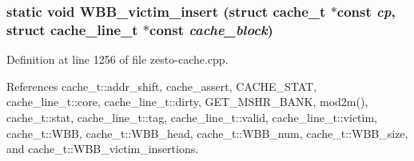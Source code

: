 \subsubsection[{WBB\_\-victim\_\-insert}]{\setlength{\rightskip}{0pt plus 5cm}static void WBB\_\-victim\_\-insert (struct {\bf cache\_\-t} $\ast$const  {\em cp}, \/  struct {\bf cache\_\-line\_\-t} $\ast$const  {\em cache\_\-block})\hspace{0.3cm}{\tt  [static]}}\label{zesto-cache_8cpp_4a2ea45f307de25eaffcd48354e67a18}




Definition at line 1256 of file zesto-cache.cpp.

References cache\_\-t::addr\_\-shift, cache\_\-assert, CACHE\_\-STAT, cache\_\-line\_\-t::core, cache\_\-line\_\-t::dirty, GET\_\-MSHR\_\-BANK, mod2m(), cache\_\-t::stat, cache\_\-line\_\-t::tag, cache\_\-line\_\-t::valid, cache\_\-line\_\-t::victim, cache\_\-t::WBB, cache\_\-t::WBB\_\-head, cache\_\-t::WBB\_\-num, cache\_\-t::WBB\_\-size, and cache\_\-t::WBB\_\-victim\_\-insertions.